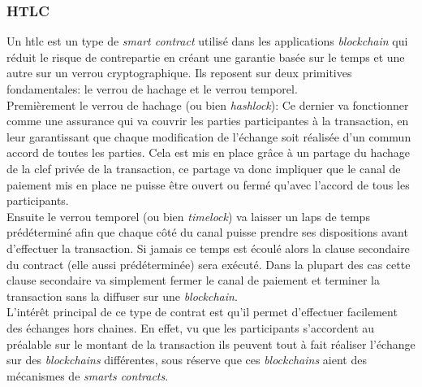 \subsubsection{HTLC}

Un \acrshort{htlc} est un type de \textit{\gls{smart contract}} utilisé dans les applications \textit{\gls{blockchain}} qui réduit le risque de contrepartie en créant une garantie basée sur le temps et une autre sur un verrou cryptographique\cite{narayanam2022generalized}.
Ils reposent sur deux primitives fondamentales: le verrou de hachage et le verrou temporel.\\
Premièrement le verrou de hachage (ou bien \textit{hashlock}): Ce dernier va fonctionner comme une assurance qui va couvrir les parties participantes à la transaction, en leur garantissant que chaque modification de l'échange soit réalisée d'un commun accord de toutes les parties.
Cela est mis en place grâce à un partage du hachage de la clef privée de la transaction, ce partage va donc impliquer que le canal de paiement mis en place ne puisse être ouvert ou fermé qu'avec l'accord de tous les participants.\\
Ensuite le verrou temporel (ou bien \textit{timelock}) va laisser un laps de temps prédéterminé afin que chaque côté du canal puisse prendre ses dispositions avant d'effectuer la transaction. Si jamais ce temps est écoulé alors la clause secondaire du contract (elle aussi prédéterminée) sera exécuté. 
Dans la plupart des cas cette clause secondaire va simplement fermer le canal de paiement et terminer la transaction sans la diffuser sur une \textit{\gls{blockchain}}.\\
L’intérêt principal de ce type de contrat est qu'il permet d'effectuer facilement des échanges hors chaines. En effet, vu que les participants s'accordent au préalable sur le montant de la transaction ils peuvent tout à fait réaliser l'échange sur des \textit{\gls{blockchain}s} différentes, sous réserve que ces \textit{\gls{blockchain}s} aient des mécanismes de \textit{smarts contracts}.

